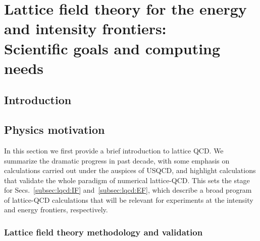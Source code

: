  
\chapter{Lattice field theory for the energy and intensity frontiers:  \\Scientific goals and computing needs}
\label{chap:LFT}

\begin{center}\begin{boldmath}



\end{boldmath}\end{center}


\section{Introduction}
\label{sec:lqcd:intro}



\section{Physics motivation}
\label{sec:lqcd:physics}

In this section we first provide a brief introduction to lattice QCD.  We summarize the dramatic progress in past decade, with some emphasis on calculations carried out under the auspices of USQCD, and highlight calculations that validate the whole paradigm of numerical lattice-QCD.  This sets the stage for Secs.~\ref{subsec:lqcd:IF} and~\ref{subsec:lqcd:EF}, which describe a broad program of lattice-QCD calculations that will be relevant for experiments at the intensity and energy frontiers, respectively.  

\subsection{Lattice field theory methodology and validation}
\label{subsec:lqcd:validation}

